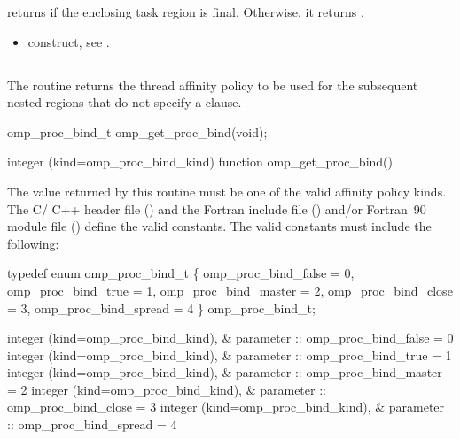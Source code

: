 \effect
{} returns  if the enclosing task region is final. Otherwise, it returns 
.

\crossreferences
\begin{itemize}
\item {} construct, see 
. 
\end{itemize}









\subsection{}
\label{subsec:omp_get_proc_bind}
\summary
The  routine returns the thread affinity policy to be used for the 
subsequent nested  regions that do not specify a  clause.

\format
\ccppspecificstart
\begin{boxedcode}
omp\_proc\_bind\_t omp\_get\_proc\_bind(void);
\end{boxedcode}
\ccppspecificend

\fortranspecificstart
\begin{boxedcode}
integer (kind=omp\_proc\_bind\_kind) function omp\_get\_proc\_bind()
\end{boxedcode}
\fortranspecificend

\constraints
The value returned by this routine must be one of the valid affinity policy kinds. The C/
C++ header file () and the Fortran include file () and/or Fortran~90 
module file () define the valid constants. The valid constants must include the 
following:

\ccppspecificstart
\begin{codepar}
typedef enum omp\_proc\_bind\_t \{
  omp\_proc\_bind\_false = 0,
  omp\_proc\_bind\_true = 1,
  omp\_proc\_bind\_master = 2,
  omp\_proc\_bind\_close = 3,
  omp\_proc\_bind\_spread = 4
\} omp\_proc\_bind\_t;
\end{codepar}
\ccppspecificend

\fortranspecificstart
\begin{codepar}
integer (kind=omp\_proc\_bind\_kind), &
                parameter :: omp\_proc\_bind\_false = 0
integer (kind=omp\_proc\_bind\_kind), &
                parameter :: omp\_proc\_bind\_true = 1
integer (kind=omp\_proc\_bind\_kind), &
                parameter :: omp\_proc\_bind\_master = 2
integer (kind=omp\_proc\_bind\_kind), &
                parameter :: omp\_proc\_bind\_close = 3
integer (kind=omp\_proc\_bind\_kind), &
                parameter :: omp\_proc\_bind\_spread = 4
\end{codepar}
\fortranspecificend

